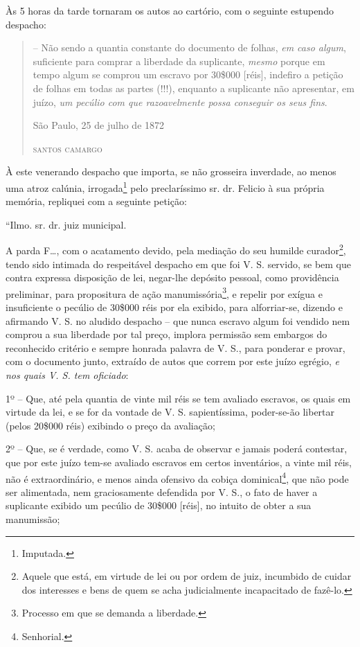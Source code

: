 Às 5 horas da tarde tornaram os autos ao cartório, com o seguinte
estupendo despacho:

\begin{quote}
-- Não sendo a quantia constante do documento de folhas, \emph{em caso
algum}, suficiente para comprar a liberdade da suplicante, \emph{mesmo}
porque em tempo algum se comprou um escravo por 30\$000 {[}réis{]},
indefiro a petição de folhas em todas as partes (!!!), enquanto a
suplicante não apresentar, em juízo, \emph{um pecúlio com que
razoavelmente possa conseguir os seus fins}.

\begin{flushright}
São Paulo, 25 de julho de 1872

\textsc{santos camargo}
\end{flushright}
\end{quote}

À este venerando despacho que importa, se não grosseira inverdade, ao
menos uma atroz calúnia, irrogada\footnote{ Imputada.} pelo
preclaríssimo sr. dr. Felicio à sua própria memória, repliquei com a
seguinte petição:

``Ilmo. sr. dr. juiz municipal.

A parda F\ldots{}, com o acatamento devido, pela mediação do seu humilde
curador\footnote{ Aquele que está, em virtude de lei ou por ordem de
  juiz, incumbido de cuidar dos interesses e bens de quem se acha
  judicialmente incapacitado de fazê-lo.}, tendo sido intimada do
respeitável despacho em que foi V. S. servido, se bem que contra
expressa disposição de lei, negar-lhe depósito pessoal, como providência
preliminar, para propositura de ação manumissória\footnote{ Processo em
  que se demanda a liberdade.}, e repelir por exígua e insuficiente o
pecúlio de 30\$000 réis por ela exibido, para alforriar-se, dizendo e
afirmando V. S. no aludido despacho -- que nunca escravo algum foi
vendido nem comprou a sua liberdade por tal preço, implora permissão sem
embargos do reconhecido critério e sempre honrada palavra de V. S., para
ponderar e provar, com o documento junto, extraído de autos que correm
por este juízo egrégio, \emph{e nos quais V. S. tem oficiado}:

1º -- Que, até pela quantia de vinte mil réis se tem avaliado escravos,
os quais em virtude da lei, e se for da vontade de V. S. sapientíssima,
poder-se-ão libertar (pelos 20\$000 réis) exibindo o preço da avaliação;

2º -- Que, se é verdade, como V. S. acaba de observar e jamais poderá
contestar, que por este juízo tem-se avaliado escravos em certos
inventários, a vinte mil réis, não é extraordinário, e menos ainda
ofensivo da cobiça dominical\footnote{ Senhorial.}, que não pode ser
alimentada, nem graciosamente defendida por V. S., o fato de haver a
suplicante exibido um pecúlio de 30\$000 {[}réis{]}, no intuito de obter
a sua manumissão;

